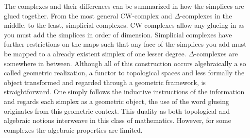 \documentclass[../../main.tex]{subfiles}
\begin{document}
    The complexes and their differences can be summarized in how the simplices are glued together. From the most general CW-complex and $\Delta$-complexes in the middle, to the least, simplicial complexes. CW-complexes allow any glueing in as you must add the simplices in order of dimension. Simplicial complexes have further restrictions on the maps such that any face of the simplices you add must be mapped to a already existent simplex of one lesser degree. $\Delta$-complexes are somewhere in between. Although all of this construction occurs algebraically a so called geometric realization, a functor to topological spaces and less formally the object transformed and regarded through a geometric framework, is straightforward. One simply follows the inductive instructions of the information and regards each simplex as a geometric object, the use of the word glueing originates from this geometric context. This duality as both topological and algebraic notions interweave in this class of mathematics. However, for some complexes the algebraic properties are limited.  
    

    
\end{document}
